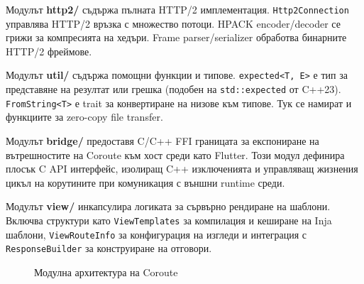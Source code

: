 Модулът \textbf{http2/} съдържа пълната HTTP/2 имплементация. \texttt{Http2Connection} управлява HTTP/2 връзка с множество потоци. HPACK encoder/decoder се грижи за компресията на хедъри. Frame parser/serializer обработва бинарните HTTP/2 фреймове.

Модулът \textbf{util/} съдържа помощни функции и типове. \texttt{expected<T, E>} е тип за представяне на резултат или грешка (подобен на \texttt{std::expected} от C++23). \texttt{FromString<T>} е trait за конвертиране на низове към типове. Тук се намират и функциите за zero-copy file transfer.

Модулът \textbf{bridge/} предоставя C/C++ FFI границата за експониране на вътрешностите на Coroute към хост среди като Flutter. Този модул дефинира плосък C API интерфейс, изолиращ C++ изключенията и управляващ жизнения цикъл на корутините при комуникация с външни runtime среди.

Модулът \textbf{view/} инкапсулира логиката за сървърно рендиране на шаблони. Включва структури като \texttt{ViewTemplates} за компилация и кеширане на Inja шаблони, \texttt{ViewRouteInfo} за конфигурация на изгледи и интеграция с \texttt{ResponseBuilder} за конструиране на отговори.

\begin{figure}[H]
\centering
{}
\caption{Модулна архитектура на Coroute}
\label{fig:architecture}
\end{figure}

